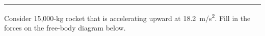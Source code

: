 \documentclass[12pt,landscape]{exam}
\newcommand{\vforce}[2]
{
  \draw[f] (a) -- ++(0, #1) 
        node[anchor=west] {#2};
}
\begin{document}
\begin{questions}
\vs \hrule \vs 

\question Consider 15,000-kg rocket that is accelerating upward at \SI{18.2}{m/s^2}.  Fill in the forces on the free-body diagram below.

\begin{center}
\end{center}

\end{questions}
\end{document}
